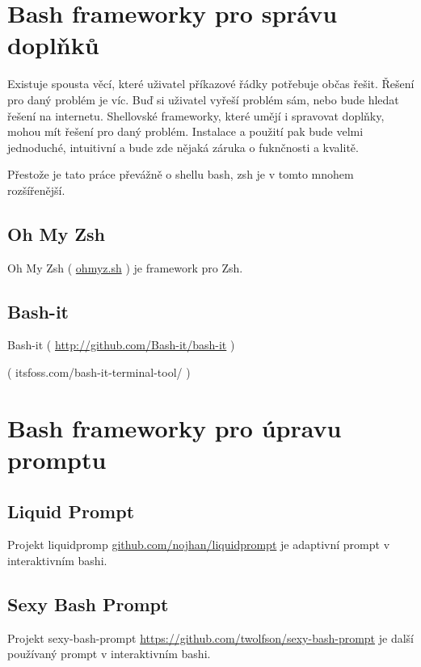 \documentclass[thesis=M,czech]{FITthesis}[2012/06/26]
\begin{document}
%
%
%
%
%

\section{Bash frameworky pro správu doplňků}

Existuje spousta věcí, které uživatel příkazové řádky potřebuje občas řešit. Řešení pro daný problém je víc. Buď si uživatel vyřeší problém sám, nebo bude hledat řešení na internetu. Shellovské frameworky, které umějí i spravovat doplňky, mohou mít řešení pro daný problém. Instalace a použití pak bude velmi jednoduché, intuitivní a bude zde nějaká záruka o fuknčnosti a kvalitě.

Přestože je tato práce převážně o shellu bash, zsh je v tomto mnohem rozšířenější.

\subsection{Oh My Zsh}

Oh My Zsh ( \url{ohmyz.sh} ) je framework pro Zsh.

\subsection{Bash-it}

Bash-it ( \url{http://github.com/Bash-it/bash-it} )

( itsfoss.com/bash-it-terminal-tool/ ) 

%
%
%

\section{Bash frameworky pro úpravu promptu}

\subsection{Liquid Prompt}

Projekt liquidpromp \url{github.com/nojhan/liquidprompt} je adaptivní prompt v interaktivním bashi.

\subsection{Sexy Bash Prompt}

Projekt sexy-bash-prompt \url{https://github.com/twolfson/sexy-bash-prompt} je další používaný prompt v interaktivním bashi.
\end{document}
